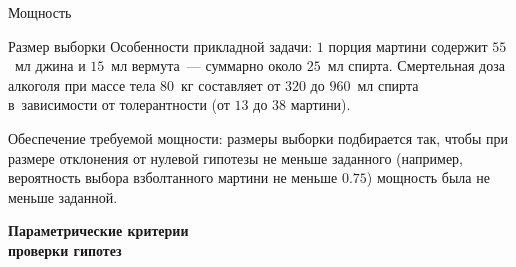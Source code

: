 \documentclass[11pt,pdf,utf8,hyperref={unicode},aspectratio=169]{beamer}
\begin{document}
\begin{frame}{Мощность}

\end{frame}

\begin{frame}{Размер выборки}
%
	Особенности прикладной задачи: $1$ порция мартини содержит $55$~мл джина и $15$~мл вермута~--- суммарно около $25$~мл спирта.
	Смертельная доза алкоголя при массе тела $80$~кг составляет от $320$ до $960$~мл спирта в~зависимости от толерантности (от $13$ до $38$ мартини).

	\bigskip

	Обеспечение требуемой мощности: размеры выборки подбирается так, чтобы при размере отклонения от нулевой гипотезы не меньше заданного (например, вероятность выбора взболтанного мартини не меньше $0.75$) мощность была не меньше заданной.
\end{frame}


\begin{frame}{}{}
    \centering
    \bfseries
    \huge
     Параметрические критерии\\ проверки гипотез

\end{frame}
\end{document}
